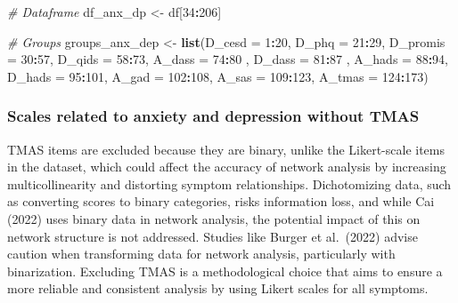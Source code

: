 \documentclass[
]{article}
\newenvironment{Shaded}{\begin{snugshade}}{\end{snugshade}}
\newcommand{\AttributeTok}[1]{\textcolor[rgb]{0.13,0.29,0.53}{#1}}
\newcommand{\CommentTok}[1]{\textcolor[rgb]{0.56,0.35,0.01}{\textit{#1}}}
\newcommand{\DecValTok}[1]{\textcolor[rgb]{0.00,0.00,0.81}{#1}}
\newcommand{\FunctionTok}[1]{\textcolor[rgb]{0.13,0.29,0.53}{\textbf{#1}}}
\newcommand{\NormalTok}[1]{#1}
\newcommand{\OtherTok}[1]{\textcolor[rgb]{0.56,0.35,0.01}{#1}}
\newcommand{\SpecialCharTok}[1]{\textcolor[rgb]{0.81,0.36,0.00}{\textbf{#1}}}
\begin{document}
\begin{Shaded}
\begin{Highlighting}[]
\CommentTok{\# Dataframe}
\NormalTok{df\_anx\_dp }\OtherTok{\textless{}{-}}\NormalTok{ df[}\DecValTok{34}\SpecialCharTok{:}\DecValTok{206}\NormalTok{]}



\CommentTok{\# Groups}
\NormalTok{groups\_anx\_dep }\OtherTok{\textless{}{-}} \FunctionTok{list}\NormalTok{(}\AttributeTok{D\_cesd =} \DecValTok{1}\SpecialCharTok{:}\DecValTok{20}\NormalTok{, }\AttributeTok{D\_phq =} \DecValTok{21}\SpecialCharTok{:}\DecValTok{29}\NormalTok{, }\AttributeTok{D\_promis =} \DecValTok{30}\SpecialCharTok{:}\DecValTok{57}\NormalTok{, }\AttributeTok{D\_qids =} \DecValTok{58}\SpecialCharTok{:}\DecValTok{73}\NormalTok{, }\AttributeTok{A\_dass =} \DecValTok{74}\SpecialCharTok{:}\DecValTok{80}\NormalTok{ , }\AttributeTok{D\_dass =} \DecValTok{81}\SpecialCharTok{:}\DecValTok{87}\NormalTok{ , }\AttributeTok{A\_hads =} \DecValTok{88}\SpecialCharTok{:}\DecValTok{94}\NormalTok{, }\AttributeTok{D\_hads =} \DecValTok{95}\SpecialCharTok{:}\DecValTok{101}\NormalTok{, }\AttributeTok{A\_gad =} \DecValTok{102}\SpecialCharTok{:}\DecValTok{108}\NormalTok{, }\AttributeTok{A\_sas =} \DecValTok{109}\SpecialCharTok{:}\DecValTok{123}\NormalTok{, }\AttributeTok{A\_tmas =} \DecValTok{124}\SpecialCharTok{:}\DecValTok{173}\NormalTok{)}
\end{Highlighting}
\end{Shaded}

\subsubsection{Scales related to anxiety and depression without
TMAS}\label{scales-related-to-anxiety-and-depression-without-tmas}

TMAS items are excluded because they are binary, unlike the Likert-scale
items in the dataset, which could affect the accuracy of network
analysis by increasing multicollinearity and distorting symptom
relationships. Dichotomizing data, such as converting scores to binary
categories, risks information loss, and while Cai (2022) uses binary
data in network analysis, the potential impact of this on network
structure is not addressed. Studies like Burger et al.~(2022) advise
caution when transforming data for network analysis, particularly with
binarization. Excluding TMAS is a methodological choice that aims to
ensure a more reliable and consistent analysis by using Likert scales
for all symptoms.
\end{document}

